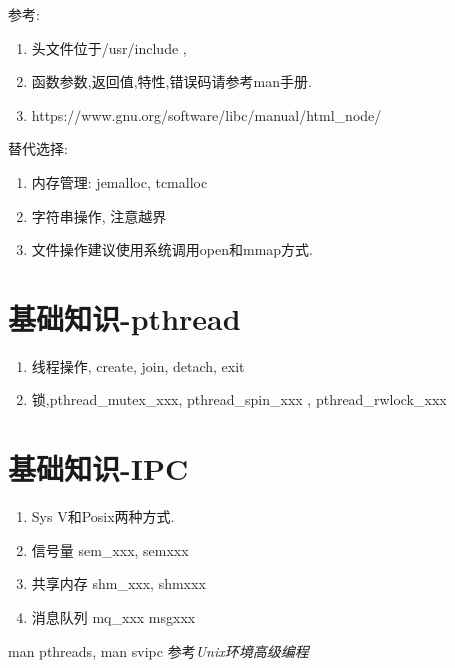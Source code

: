 参考:
\begin{enumerate}
\item 头文件位于/usr/include ,
\item 函数参数,返回值,特性,错误码请参考man手册.
\item https://www.gnu.org/software/libc/manual/html\_node/
\end{enumerate}

替代选择:
\begin{enumerate}
\item 内存管理: jemalloc, tcmalloc
\item 字符串操作, 注意越界
\item 文件操作建议使用系统调用open和mmap方式.
\end{enumerate}

\section{基础知识-pthread}

\begin{enumerate}
\item  线程操作, create, join, detach, exit
\item  锁,pthread\_mutex\_xxx, pthread\_spin\_xxx , pthread\_rwlock\_xxx
\end{enumerate}

\section{基础知识-IPC}

\begin{enumerate}
\item Sys V和Posix两种方式.
\item 信号量 sem\_xxx, semxxx
\item 共享内存 shm\_xxx, shmxxx
\item 消息队列  mq\_xxx msgxxx
\end{enumerate}
man pthreads,  man svipc
参考\it{Unix环境高级编程}


